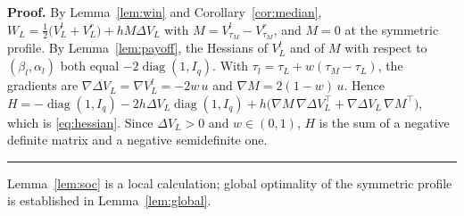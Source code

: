 \documentclass[12pt,letterpaper]{article}
\newenvironment{proof}[1][Proof]{\noindent\textbf{#1.} }{\ \rule{0.5em}{0.5em}}
\begin{document}
\begin{proof}
By Lemma~\ref{lem:win} and Corollary~\ref{cor:median}, $W_L=\tfrac12\big(V_L^l+V_L^r\big)+hM\Delta V_L$ with $M=V_{\tau_M}^l-V_{\tau_M}^r$, and $M=0$ at the symmetric profile. By Lemma~\ref{lem:payoff}, the Hessians of $V_L^l$ and of $M$ with respect to $(\beta_l,\alpha_l)$ both equal $-2\operatorname{diag}(1,I_q)$. With $\tau_l=\tau_L+w(\tau_M-\tau_L)$, the gradients are $\nabla\Delta V_L=\nabla V_L^l=-2w\,u$ and $\nabla M=2(1-w)\,u$. Hence $H=-\operatorname{diag}(1,I_q)-2h\Delta V_L\operatorname{diag}(1,I_q)+h\big(\nabla M\,\nabla\Delta V_L^{\top}+\nabla\Delta V_L\,\nabla M^{\top}\big)$, which is \eqref{eq:hessian}. Since $\Delta V_L>0$ and $w\in(0,1)$, $H$ is the sum of a negative definite matrix and a negative semidefinite one.
\end{proof}

Lemma~\ref{lem:soc} is a local calculation; global optimality of the symmetric profile is established in Lemma~\ref{lem:global}.
\end{document}

